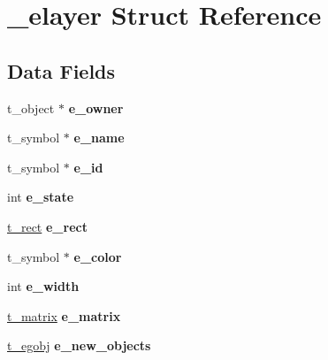 \hypertarget{struct__elayer}{\section{\-\_\-elayer Struct Reference}
\label{struct__elayer}
}
\subsection*{Data Fields}
\begin{DoxyCompactItemize}
\item 
\hypertarget{struct__elayer_a2a35e154dc0053b0c8078d322ee1b5e3}{t\-\_\-object $\ast$ {\bfseries e\-\_\-owner}}\label{struct__elayer_a2a35e154dc0053b0c8078d322ee1b5e3}

\item 
\hypertarget{struct__elayer_a6d8c2140844c7949fe9bc0384b2129d8}{t\-\_\-symbol $\ast$ {\bfseries e\-\_\-name}}\label{struct__elayer_a6d8c2140844c7949fe9bc0384b2129d8}

\item 
\hypertarget{struct__elayer_a1f5d3d53b83fa9009ede11f8a9902dff}{t\-\_\-symbol $\ast$ {\bfseries e\-\_\-id}}\label{struct__elayer_a1f5d3d53b83fa9009ede11f8a9902dff}

\item 
\hypertarget{struct__elayer_a6ebb09ffbaedff41ff95d74f7ebdb71b}{int {\bfseries e\-\_\-state}}\label{struct__elayer_a6ebb09ffbaedff41ff95d74f7ebdb71b}

\item 
\hypertarget{struct__elayer_aaef55281ce06e8d04077acd1e73e484e}{\hyperlink{struct__rect}{t\-\_\-rect} {\bfseries e\-\_\-rect}}\label{struct__elayer_aaef55281ce06e8d04077acd1e73e484e}

\item 
\hypertarget{struct__elayer_a13dfb00aea95e0dc5b9d1297260a9280}{t\-\_\-symbol $\ast$ {\bfseries e\-\_\-color}}\label{struct__elayer_a13dfb00aea95e0dc5b9d1297260a9280}

\item 
\hypertarget{struct__elayer_a26f97d1c75fc42217031b4936517e928}{int {\bfseries e\-\_\-width}}\label{struct__elayer_a26f97d1c75fc42217031b4936517e928}

\item 
\hypertarget{struct__elayer_a62d53e14693deed3469c69dc3a857493}{\hyperlink{struct__matrix}{t\-\_\-matrix} {\bfseries e\-\_\-matrix}}\label{struct__elayer_a62d53e14693deed3469c69dc3a857493}

\item 
\hypertarget{struct__elayer_a793a735e42cff87ab0df8772c76fe039}{\hyperlink{struct__egobj}{t\-\_\-egobj} {\bfseries e\-\_\-new\-\_\-objects}}\label{struct__elayer_a793a735e42cff87ab0df8772c76fe039}


\end{DoxyCompactItemize}
